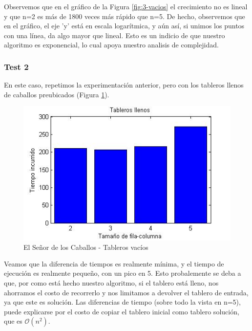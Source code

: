 Observemos que en el gráfico de la Figura \ref{fig:3-vacios} el crecimiento no es lineal y que n=2 es más de 1800 veces más rápido que n=5. De hecho, observemos que en el gráfico, el eje 'y' está en escala logarítmica, y aún así, si unimos los puntos con una línea, da algo mayor que lineal. Esto es un indicio de que nuestro algoritmo es exponencial, lo cual apoya nuestro analisis de complejidad.

\vspace*{0.6cm}

\subsubsection{Test 2}

\vspace*{0.3cm}

En este caso, repetimos la experimentación anterior, pero con los tableros llenos de caballos preubicados (Figura \ref{fig:3-llenos}).

\begin{figure}[htb]
	\begin{center}
    		\includegraphics[scale=0.5]{imagenes/3-llenos.jpg}
	\end{center}
	\caption{El Señor de los Caballos - Tableros vacíos}\label{fig:3-llenos}
\end{figure}

Veamos que la diferencia de tiempos es realmente mínima, y el tiempo de ejecución es realmente pequeño, con un pico en 5. Esto probalemente se deba a que, por como está hecho nuestro algoritmo, si el tablero está lleno, nos ahorramos el costo de recorrerlo y nos limitamos a devolver el tablero de entrada, ya que este es solución. Las diferencias de tiempo (sobre todo la vista en n=5), puede explicarse por el costo de copiar el tablero inicial como tablero solución, que es $\mathcal{O}(n^2)$.

